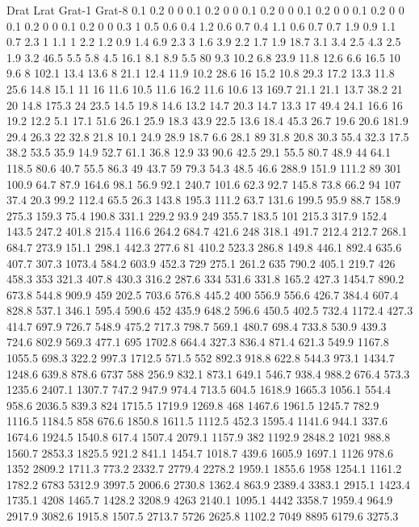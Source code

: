 Drat	Lrat	Grat-1	Grat-8
0.1	0.2	0	0
0.1	0.2	0	0
0.1	0.2	0	0
0.1	0.2	0	0
0.1	0.2	0	0
0.1	0.2	0	0
0.1	0.2	0	0
0.3	1	0.5	0.6
0.4	1.2	0.6	0.7
0.4	1.1	0.6	0.7
0.7	1.9	0.9	1.1
0.7	2.3	1	1.1
1	2.2	1.2	0.9
1.4	6.9	2.3	3
1.6	3.9	2.2	1.7
1.9	18.7	3.1	3.4
2.5	4.3	2.5	1.9
3.2	46.5	5.5	5.8
4.5	16.1	8.1	8.9
5.5	80	9.3	10.2
6.8	23.9	11.8	12.6
6.6	16.5	10	9.6
8	102.1	13.4	13.6
8	21.1	12.4	11.9
10.2	28.6	16	15.2
10.8	29.3	17.2	13.3
11.8	25.6	14.8	15.1
11	16	11.6	10.5
11.6	16.2	11.6	10.6
13	169.7	21.1	21.1
13.7	38.2	21	20
14.8	175.3	24	23.5
14.5	19.8	14.6	13.2
14.7	20.3	14.7	13.3
17	49.4	24.1	16.6
16	19.2	12.2	5.1
17.1	51.6	26.1	25.9
18.3	43.9	22.5	13.6
18.4	45.3	26.7	19.6
20.6	181.9	29.4	26.3
22	32.8	21.8	10.1
24.9	28.9	18.7	6.6
28.1	89	31.8	20.8
30.3	55.4	32.3	17.5
38.2	53.5	35.9	14.9
52.7	61.1	36.8	12.9
33	90.6	42.5	29.1
55.5	80.7	48.9	44
64.1	118.5	80.6	40.7
55.5	86.3	49	43.7
59	79.3	54.3	48.5
46.6	288.9	151.9	111.2
89	301	100.9	64.7
87.9	164.6	98.1	56.9
92.1	240.7	101.6	62.3
92.7	145.8	73.8	66.2
94	107	37.4	20.3
99.2	112.4	65.5	26.3
143.8	195.3	111.2	63.7
131.6	199.5	95.9	88.7
158.9	275.3	159.3	75.4
190.8	331.1	229.2	93.9
249	355.7	183.5	101
215.3	317.9	152.4	143.5
247.2	401.8	215.4	116.6
264.2	684.7	421.6	248
318.1	491.7	212.4	212.7
268.1	684.7	273.9	151.1
298.1	442.3	277.6	81
410.2	523.3	286.8	149.8
446.1	892.4	635.6	407.7
307.3	1073.4	584.2	603.9
452.3	729	275.1	261.2
635	790.2	405.1	219.7
426	458.3	353	321.3
407.8	430.3	316.2	287.6
334	531.6	331.8	165.2
427.3	1454.7	890.2	673.8
544.8	909.9	459	202.5
703.6	576.8	445.2	400
556.9	556.6	426.7	384.4
607.4	828.8	537.1	346.1
595.4	590.6	452	435.9
648.2	596.6	450.5	402.5
732.4	1172.4	427.3	414.7
697.9	726.7	548.9	475.2
717.3	798.7	569.1	480.7
698.4	733.8	530.9	439.3
724.6	802.9	569.3	477.1
695	1702.8	664.4	327.3
836.4	871.4	621.3	549.9
1167.8	1055.5	698.3	322.2
997.3	1712.5	571.5	552
892.3	918.8	622.8	544.3
973.1	1434.7	1248.6	639.8
878.6	6737	588	256.9
832.1	873.1	649.1	546.7
938.4	988.2	676.4	573.3
1235.6	2407.1	1307.7	747.2
947.9	974.4	713.5	604.5
1618.9	1665.3	1056.1	554.4
958.6	2036.5	839.3	824
1715.5	1719.9	1269.8	468
1467.6	1961.5	1245.7	782.9
1116.5	1184.5	858	676.6
1850.8	1611.5	1112.5	452.3
1595.4	1141.6	944.1	337.6
1674.6	1924.5	1540.8	617.4
1507.4	2079.1	1157.9	382
1192.9	2848.2	1021	988.8
1560.7	2853.3	1825.5	921.2
841.1	1454.7	1018.7	439.6
1605.9	1697.1	1126	978.6
1352	2809.2	1711.3	773.2
2332.7	2779.4	2278.2	1959.1
1855.6	1958	1254.1	1161.2
1782.2	6783	5312.9	3997.5
2006.6	2730.8	1362.4	863.9
2389.4	3383.1	2915.1	1423.4
1735.1	4208	1465.7	1428.2
3208.9	4263	2140.1	1095.1
4442	3358.7	1959.4	964.9
2917.9	3082.6	1915.8	1507.5
2713.7	5726	2625.8	1102.2
7049	8895	6179.6	3275.3
